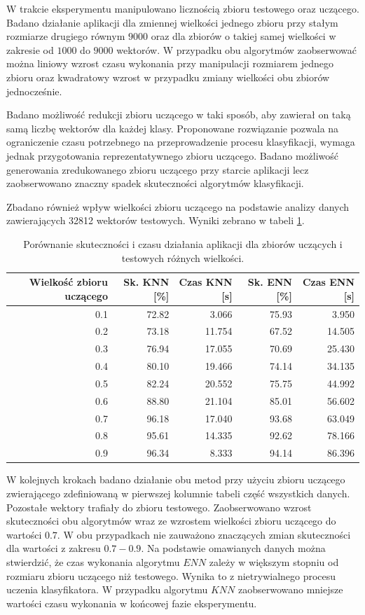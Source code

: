 W trakcie eksperymentu manipulowano licznością zbioru testowego oraz uczącego. Badano działanie aplikacji dla zmiennej wielkości jednego zbioru przy stałym rozmiarze drugiego równym $9000$ oraz dla zbiorów o takiej samej wielkości w zakresie od $1000$ do $9000$ wektorów. W przypadku obu algorytmów zaobserwować można liniowy wzrost czasu wykonania przy manipulacji rozmiarem jednego zbioru oraz kwadratowy wzrost w przypadku zmiany wielkości obu zbiorów jednocześnie.

Badano możliwość redukcji zbioru uczącego w taki sposób, aby zawierał on taką samą liczbę wektorów dla każdej klasy. Proponowane rozwiązanie pozwala na ograniczenie czasu potrzebnego na przeprowadzenie procesu klasyfikacji, wymaga jednak przygotowania reprezentatywnego zbioru uczącego. Badano możliwość generowania zredukowanego zbioru uczącego przy starcie aplikacji lecz zaobserwowano znaczny spadek skuteczności algorytmów klasyfikacji. 

Zbadano również wpływ wielkości zbioru uczącego na podstawie analizy danych zawierających 32812 wektorów testowych. Wyniki zebrano w tabeli \ref{tab:rozmiar-zbioru-uczacego}.

\begin{table}[H]
	\centering
	\begin{tabular}{|r|r|r|r|r|}
		\hline
		Wielkość zbioru uczącego & Sk. KNN [\%] & Czas KNN [s] & Sk. ENN [\%] & Czas ENN [s]  \\ 
		\hline
		0.1 & 72.82 & 3.066 & 75.93 & 3.950\\
		\hline
		0.2 & 73.18 & 11.754 & 67.52 & 14.505 \\
		\hline
		0.3 & 76.94 & 17.055 & 70.69 & 25.430 \\
		\hline
		0.4 & 80.10 & 19.466 & 74.14 & 34.135 \\
		\hline
		0.5 & 82.24 & 20.552 & 75.75 &  44.992\\
		\hline
		0.6 & 88.80 & 21.104 & 85.01 & 56.602 \\
		\hline
		0.7 & 96.18 & 17.040 & 93.68 & 63.049 \\
		\hline
		0.8 & 95.61 & 14.335 & 92.62 & 78.166 \\
		\hline
		0.9 & 96.34 & 8.333 & 94.14 & 86.396 \\
		\hline
	\end{tabular}
	\caption{Porównanie skuteczności i czasu działania aplikacji dla zbiorów uczących i testowych różnych wielkości.}
	\label{tab:rozmiar-zbioru-uczacego}	
\end{table}
W kolejnych krokach badano działanie obu metod przy użyciu zbioru uczącego zwierającego zdefiniowaną w pierwszej kolumnie tabeli część wszystkich danych. Pozostałe wektory trafiały do zbioru testowego. Zaobserwowano wzrost skuteczności obu algorytmów wraz ze wzrostem wielkości zbioru uczącego do wartości $0.7$. W obu przypadkach nie zauważono znaczących zmian skuteczności dla wartości z zakresu $0.7-0.9$. Na podstawie omawianych danych można stwierdzić, że czas wykonania algorytmu $ENN$ zależy w większym stopniu od rozmiaru zbioru uczącego niż testowego. Wynika to z nietrywialnego procesu uczenia klasyfikatora. W przypadku algorytmu $KNN$ zaobserwowano mniejsze wartości czasu wykonania w końcowej fazie eksperymentu.
